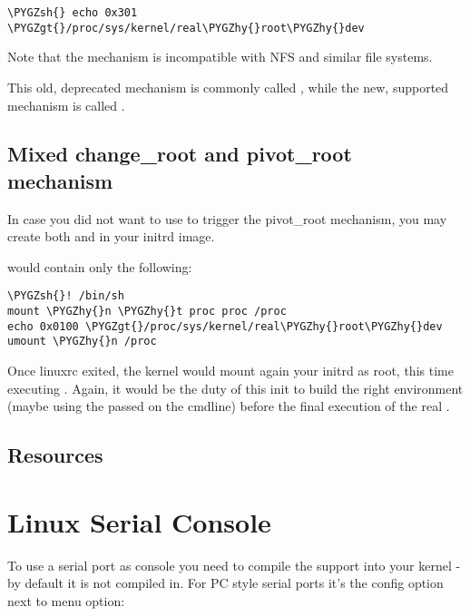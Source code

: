 \documentclass[a4paper,8pt,english]{sphinxmanual}
\def\PYGZgt{\char`\>}
\def\PYGZsh{\char`\#}
\def\PYGZhy{\char`\-}
\begin{document}
\begin{Verbatim}[commandchars=\\\{\}]
\PYGZsh{} echo 0x301 \PYGZgt{}/proc/sys/kernel/real\PYGZhy{}root\PYGZhy{}dev
\end{Verbatim}

Note that the mechanism is incompatible with NFS and similar file
systems.

This old, deprecated mechanism is commonly called , while
the new, supported mechanism is called .


\section{Mixed change\_root and pivot\_root mechanism}
\label{admin-guide/initrd:mixed-change-root-and-pivot-root-mechanism}
In case you did not want to use  to trigger the pivot\_root
mechanism, you may create both  and  in your initrd
image.

 would contain only the following:

\begin{Verbatim}[commandchars=\\\{\}]
\PYGZsh{}! /bin/sh
mount \PYGZhy{}n \PYGZhy{}t proc proc /proc
echo 0x0100 \PYGZgt{}/proc/sys/kernel/real\PYGZhy{}root\PYGZhy{}dev
umount \PYGZhy{}n /proc
\end{Verbatim}

Once linuxrc exited, the kernel would mount again your initrd as root,
this time executing . Again, it would be the duty of this init
to build the right environment (maybe using the  passed on
the cmdline) before the final execution of the real .


\section{Resources}
\label{admin-guide/initrd:resources}

\chapter{Linux Serial Console}
\label{admin-guide/serial-console::doc}\label{admin-guide/serial-console:serial-console}\label{admin-guide/serial-console:linux-serial-console}
To use a serial port as console you need to compile the support into your
kernel - by default it is not compiled in. For PC style serial ports
it's the config option next to menu option:
\end{document}
